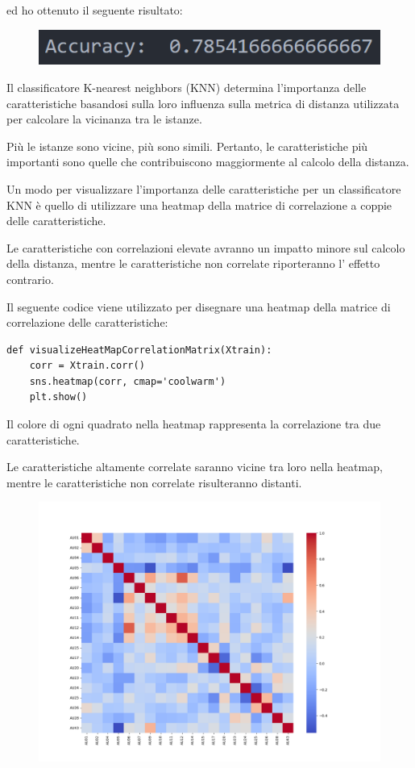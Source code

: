 ed ho ottenuto il seguente risultato:

\begin{figure}
    \begin{center}    
        \includegraphics[width=0.9\linewidth]{images/image38.png}
    \end{center}
\end{figure}

Il classificatore K-nearest neighbors (KNN) determina l'importanza delle caratteristiche basandosi sulla loro influenza sulla metrica di distanza utilizzata per calcolare la vicinanza tra le istanze. 

Più le istanze sono vicine, più sono simili. Pertanto, le caratteristiche più importanti sono quelle che contribuiscono maggiormente al calcolo della distanza.

Un modo per visualizzare l'importanza delle caratteristiche per un classificatore KNN è quello di utilizzare una heatmap della matrice di correlazione a coppie delle caratteristiche. 

Le caratteristiche con correlazioni elevate avranno un impatto minore sul calcolo della distanza, mentre le caratteristiche non correlate riporteranno l' effetto contrario.

Il seguente codice viene utilizzato per disegnare una heatmap della matrice di correlazione delle caratteristiche:
\begin{verbatim}
def visualizeHeatMapCorrelationMatrix(Xtrain):
    corr = Xtrain.corr()
    sns.heatmap(corr, cmap='coolwarm')
    plt.show()
\end{verbatim}

Il colore di ogni quadrato nella heatmap rappresenta la correlazione tra due caratteristiche. 

Le caratteristiche altamente correlate saranno vicine tra loro nella heatmap, mentre le caratteristiche non correlate risulteranno distanti. 

\begin{figure}
    \begin{center}    
        \includegraphics[width=0.9\linewidth]{images/image39.png}
    \end{center}
\end{figure}

